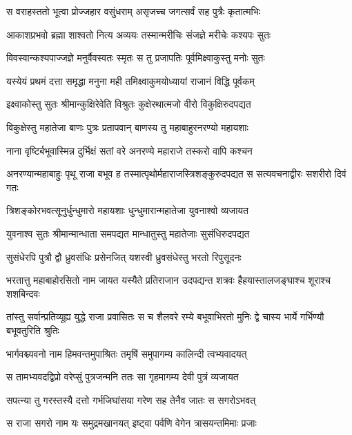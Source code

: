 \twolineshloka
{स वराहस्ततो भूत्वा प्रोज्जहार वसुंधराम्}
{असृजच्च जगत्सर्वं सह पुत्रैः कृतात्मभिः} %

\twolineshloka
{आकाशप्रभवो ब्रह्मा शाश्वतो नित्य अव्ययः}
{तस्मान्मरीचिः संजज्ञे मरीचेः कश्यपः सुतः} %

\twolineshloka
{विवस्वान्कश्यपाज्जज्ञे मनुर्वैवस्वतः स्मृतः}
{स तु प्रजापतिः पूर्वमिक्ष्वाकुस्तु मनोः सुतः} %

\twolineshloka
{यस्येयं प्रथमं दत्ता समृद्धा मनुना मही}
{तमिक्ष्वाकुमयोध्यायां राजानं विद्धि पूर्वकम्} %

\twolineshloka
{इक्ष्वाकोस्तु सुतः श्रीमान्कुक्षिरेवेति विश्रुतः}
{कुक्षेरथात्मजो वीरो विकुक्षिरुदपद्यत} %

\twolineshloka
{विकुक्षेस्तु महातेजा बाणः पुत्रः प्रतापवान्}
{बाणस्य तु महाबाहुरनरण्यो महायशाः} %

\twolineshloka
{नाना वृष्टिर्बभूवास्मिन्न दुर्भिक्षं सतां वरे}
{अनरण्ये महाराजे तस्करो वापि कश्चन} %

\threelineshloka
{अनरण्यान्महाबाहुः पृथू राजा बभूव ह}
{तस्मात्पृथोर्महाराजस्त्रिशङ्कुरुदपद्यत}
{स सत्यवचनाद्वीरः सशरीरो दिवं गतः} %

\twolineshloka
{त्रिशङ्कोरभवत्सूनुर्धुन्धुमारो महायशाः}
{धुन्धुमारान्महातेजा युवनाश्वो व्यजायत} %

\twolineshloka
{युवनाश्व सुतः श्रीमान्मान्धाता समपद्यत}
{मान्धातुस्तु महातेजाः सुसंधिरुदपद्यत} %

\twolineshloka
{सुसंधेरपि पुत्रौ द्वौ ध्रुवसंधिः प्रसेनजित्}
{यशस्वी ध्रुवसंधेस्तु भरतो रिपुसूदनः} %

\threelineshloka
{भरतात्तु महाबाहोरसितो नाम जायत}
{यस्यैते प्रतिराजान उदपद्यन्त शत्रवः}
{हैहयास्तालजङ्घाश्च शूराश्च शशबिन्दवः} %

\threelineshloka
{तांस्तु सर्वान्प्रतिव्यूह्य युद्धे राजा प्रवासितः}
{स च शैलवरे रम्ये बभूवाभिरतो मुनिः}
{द्वे चास्य भार्ये गर्भिण्यौ बभूवतुरिति श्रुतिः} %

\twolineshloka
{भार्गवश्च्यवनो नाम हिमवन्तमुपाश्रितः}
{तमृषिं समुपागम्य कालिन्दी त्वभ्यवादयत्} %

\twolineshloka
{स तामभ्यवदद्विप्रो वरेप्सुं पुत्रजन्मनि}
{ततः सा गृहमागम्य देवी पुत्रं व्यजायत} %

\twolineshloka
{सपत्न्या तु गरस्तस्यै दत्तो गर्भजिघांसया}
{गरेण सह तेनैव जातः स सगरोऽभवत्} %

\twolineshloka
{स राजा सगरो नाम यः समुद्रमखानयत्}
{इष्ट्वा पर्वणि वेगेन त्रासयन्तमिमाः प्रजाः} %

